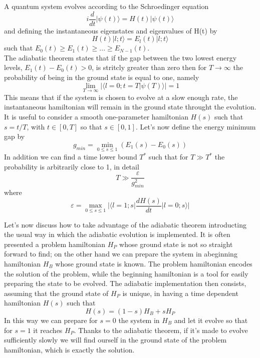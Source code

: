 \documentclass[aps,pra,reprint, onecolumn, showkeys]{revtex4-2}
\begin{document}
A quantum system evolves according to the Schroedinger equation
\begin{equation}
	i\frac{d}{dt}|\psi(t)\rangle = H(t)|\psi(t)\rangle
\end{equation}
and defining the instantaneous eigenstates and eigenvalues of H(t) by
\begin{equation}
	H(t)|l;t\rangle = E_l(t)|l;t\rangle
\end{equation}
such that $E_0(t) \geq E_1(t) \geq ... \geq E_{N-1}(t)$. \\
The adiabatic theorem states that if the gap between the two lowest energy levels, $E_{1}(t) - E_{0}(t) > 0$, is stritcly greater than zero then for $T\rightarrow \infty$ the probability of being in the ground state is equal to one, namely
\begin{equation}
	\lim_{T \to \infty} |\langle l=0;t = T | \psi(T)\rangle| = 1
\end{equation}
This means that if the system is chosen to evolve at a slow enough rate, the instantaneous hamiltonian will remain in the ground state throught the evolution. It is useful to consider a smooth one-parameter hamiltonian $H(s)$ such that $s=t/T$, with $t \in [0,T]$ so that $s \in [0,1]$.
Let's now define the energy minimum gap by
\begin{equation}
	g_{min} = \min_{0 \leq s \leq 1} (E_1(s)-E_0(s))
\end{equation}
In addition we can find a time lower bound $T^*$ such that for $T\gg T^{*}$ the probability is arbitrarily close to 1, in detail
\begin{equation}
	T \gg \frac{\varepsilon}{g^{2}_{min}}
\end{equation}
where
\begin{equation}
	\varepsilon = \max_{0 \leq s \leq 1} \Big| \Big\langle l=1;s\Big| \frac{dH(s)}{dt} \Big| l=0;s\Big\rangle\Big|
\end{equation}

Let's now discuss how to take advantage of the adiabatic theorem introducting the usual way in which the adiabatic evolution is implemented. It is often presented a problem hamiltonian $H_P$ whose ground state is not so straight forward to find; on the other hand we can prepare the system in abeginning hamiltonian $H_B$ whose ground state is known. The problem hamiltonian encodes the solution of the problem, while the beginning hamiltonian is a tool for easily preparing the state to be evolved. The adiabatic implementation then consists, assuming that the ground state of $H_P$ is unique, in having a time dependent hamiltonian $H(s)$ such that
\begin{equation}
	H(s) = (1-s)H_B + s H_P
\end{equation}
In this way we can prepare for $s=0$ the system in $H_B$ and let it evolve so that for $s=1$ it reaches $H_P$. Thanks to the adiabatic theorem, if it's made to evolve sufficiently slowly we will find ourself in the ground state of the problem hamiltonian, which is exactly the solution.
\end{document}
